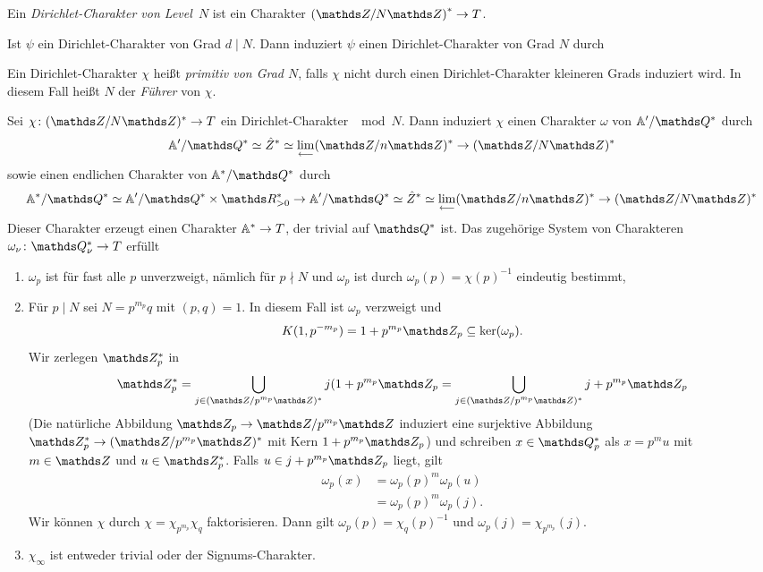 \begin{defi}
Ein \emph{Dirichlet-Charakter von \glqq Level\grqq\ $N$}
ist ein Charakter $\left(\Z/N\Z\right)^\ast \to T$.
\end{defi}
Ist $\psi$ ein Dirichlet-Charakter von Grad $d \mid N$.
Dann induziert $\psi$ einen Dirichlet-Charakter von Grad $N$ durch
\begin{defi}
Ein Dirichlet-Charakter $\chi$ heißt \emph{primitiv von Grad $N$},
falls $\chi$ nicht durch einen Dirichlet-Charakter kleineren Grads induziert wird.
In diesem Fall heißt $N$ der \emph{Führer} von $\chi$.
\end{defi}
\begin{prop}
Sei $\chi \colon (\Z/N\Z)^\ast \to T$ ein Dirichlet-Charakter $\mod N$.
Dann induziert $\chi$ einen Charakter $\omega$ von $\A'/\Q^\ast$ durch
\begin{align*}
\A'/\Q^\ast \simeq \hat{Z}^\ast \simeq \lim_{\longleftarrow} (\Z/n\Z)^\ast \to (\Z/N\Z)^\ast
\end{align*}
sowie einen endlichen Charakter von $\A^\ast/\Q^\ast$
durch
\begin{align*}
\A^\ast/\Q^\ast \simeq \A'/\Q^\ast \times \R_{>0}^\ast \to \A'/\Q^\ast \simeq \hat{Z}^\ast \simeq \lim_{\longleftarrow} (\Z/n\Z)^\ast \to (\Z/N\Z)^\ast
\end{align*}
Dieser Charakter erzeugt einen Charakter $\mathbb{A}^\ast \to T$, der trivial auf $\Q^\ast$ ist.
Das zugehörige System von Charakteren $\omega_\nu \colon \Q_\nu^\ast \to T$ erfüllt
\begin{enumerate}[label=\roman*)]
\item $\omega_p$ ist für fast alle $p$ unverzweigt, nämlich für $p \nmid N$ und $\omega_p$
ist durch $\omega_p(p)=\chi(p)^{-1}$ eindeutig bestimmt,
\item Für $p \mid N$ sei $N=p^{m_p}q$ mit $(p,q)=1$. In diesem Fall ist $\omega_p$ verzweigt und
\begin{align*}
K(1,p^{-m_p})=1+p^{m_p}\Z_p \subseteq \ker(\omega_p).
\end{align*}
Wir zerlegen $\Z_p^\ast$ in
\begin{align*}
\Z_p^\ast=\bigcup_{j \in (\Z/p^{m_p}\Z)^\ast} j(1+p^{m_p}\Z_p=\bigcup_{j \in (\Z/p^{m_p}\Z)^\ast} j+p^{m_p}\Z_p
\end{align*}
(Die natürliche Abbildung $\Z_p \to \Z/p^{m_p}\Z$ induziert eine surjektive Abbildung $\Z_p^\ast \to (\Z/p^{m_p} \Z)^\ast$ mit Kern $1+p^{m_p}\Z_p$) und schreiben $x \in \Q_p^\ast$ als
$x=p^m u$ mit $m \in \Z$ und $u \in \Z_p^\ast$. Falls $u \in j+p^{m_p}\Z_p$ liegt, gilt
\begin{align*}
\omega_p(x)&=\omega_p(p)^m\omega_p(u)\\
&=\omega_p(p)^m \omega_p(j).
\end{align*}
Wir können $\chi$ durch $\chi=\chi_{p^{m_p}} \chi_q$ faktorisieren.
Dann gilt $\omega_p(p)=\chi_q(p)^{-1}$ und $\omega_p(j)=\chi_{p^{m_p}}(j)$.
\item $\chi_\infty$ ist entweder trivial oder der Signums-Charakter.
\end{enumerate}
\end{prop}
